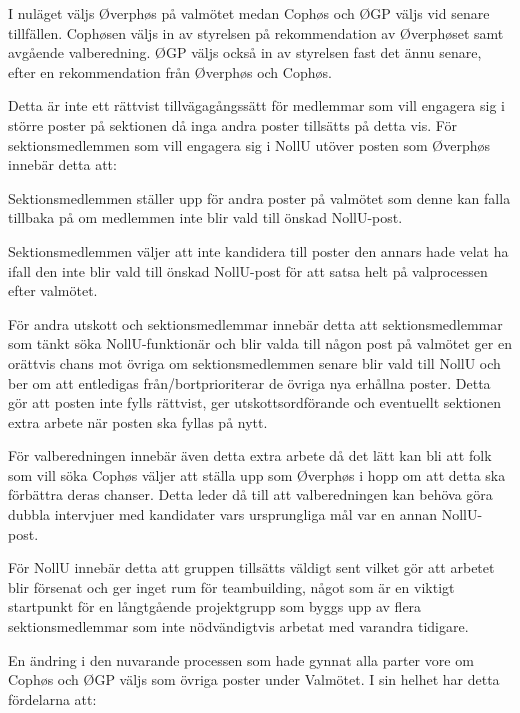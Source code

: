 \documentclass[../_main/handlingar.tex]{subfiles}
\begin{document}
I nuläget väljs Øverphøs på valmötet medan Cophøs och ØGP väljs vid senare tillfällen.
Cophøsen väljs in av styrelsen på rekommendation av Øverphøset samt avgående
valberedning. ØGP väljs också in av styrelsen fast det ännu senare, efter en rekommendation
från Øverphøs och Cophøs.

Detta är inte ett rättvist tillvägagångssätt för medlemmar som vill engagera sig i större poster
på sektionen då inga andra poster tillsätts på detta vis. För sektionsmedlemmen som vill
engagera sig i NollU utöver posten som Øverphøs innebär detta att:

\begin{dashlist}
\item Sektionsmedlemmen ställer upp för andra poster på valmötet som denne kan falla tillbaka
på om medlemmen inte blir vald till önskad NollU-post.
\item Sektionsmedlemmen väljer att inte kandidera till poster den annars hade velat ha ifall den
inte blir vald till önskad NollU-post för att satsa helt på valprocessen efter valmötet.
\end{dashlist}

För andra utskott och sektionsmedlemmar innebär detta att sektionsmedlemmar som tänkt
söka NollU-funktionär och blir valda till någon post på valmötet ger en orättvis chans mot
övriga om sektionsmedlemmen senare blir vald till NollU och ber om att entledigas
från/bortprioriterar de övriga nya erhållna poster. Detta gör att posten inte fylls rättvist, ger
utskottsordförande och eventuellt sektionen extra arbete när posten ska fyllas på nytt.

För valberedningen innebär även detta extra arbete då det lätt kan bli att folk som vill söka
Cophøs väljer att ställa upp som Øverphøs i hopp om att detta ska förbättra deras chanser.
Detta leder då till att valberedningen kan behöva göra dubbla intervjuer med kandidater vars
ursprungliga mål var en annan NollU-post.

För NollU innebär detta att gruppen tillsätts väldigt sent vilket gör att arbetet blir försenat och
ger inget rum för teambuilding, något som är en viktigt startpunkt för en långtgående
projektgrupp som byggs upp av flera sektionsmedlemmar som inte nödvändigtvis arbetat med
varandra tidigare.

En ändring i den nuvarande processen som hade gynnat alla parter vore om Cophøs och ØGP
väljs som övriga poster under Valmötet. I sin helhet har detta fördelarna att:
\end{document}
